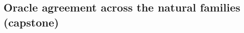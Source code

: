\documentclass[11pt,a4paper]{article}
\begin{document}
\subsection{Oracle agreement across the natural families (capstone)}
\label{sec:res-capstone}
\end{document}
